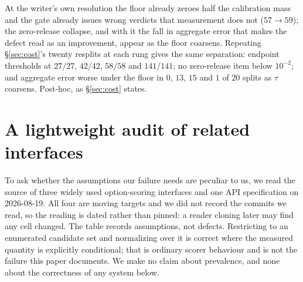 \documentclass{article}
\newif\ifclaimtags\claimtagsfalse
\newcommand{\ct}[1]{\ifclaimtags\hfill{\scriptsize\textcolor{gray}{[#1]}}\fi}
\begin{document}
\noindent At the writer's own resolution the floor already zeroes half the
calibration mass and the gate already issues wrong verdicts that measurement
does not ($57 \to 59$); the zero-release collapse, and with it the fall in aggregate error that
makes the defect read as an improvement, appear as the floor coarsens. Repeating
\S\ref{sec:cost}'s twenty resplits at each rung gives the same separation:
endpoint thresholds at $27/27$, $42/42$, $58/58$ and $141/141$; no zero-release
item below $10^{-2}$; and aggregate error worse under the floor in $0$, $13$,
$15$ and $1$ of $20$ splits as $\tau$ coarsens. Post-hoc, as \S\ref{sec:cost}
states.\ct{C81, C91, C92, C93}

\section{A lightweight audit of related interfaces}\label{app:audit}
To ask whether the assumptions our failure needs are peculiar to us, we read the source of three widely used option-scoring interfaces and one API
specification on 2026-08-19. All four are moving targets and we did not record
the commits we read, so the reading is dated rather than pinned: a reader
cloning later may find any cell changed. The table records assumptions,
not defects. Restricting to an enumerated candidate set and
normalizing over it is correct where the measured quantity is explicitly conditional; that
is ordinary scorer behaviour and is not the failure this paper documents. We make no claim
about prevalence, and none about the correctness of any system below.
\end{document}
